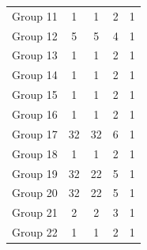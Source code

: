 \begin{table}[t]
\begin{tabular}{@{}rcccc@{}}
        Group 11 & 1                               & 1                                         & 2                                          & 1                                      \\
        Group 12 & 5                               & 5                                         & 4                                          & 1                                      \\
        Group 13 & 1                               & 1                                         & 2                                          & 1                                      \\
        Group 14 & 1                               & 1                                         & 2                                          & 1                                      \\
        Group 15 & 1                               & 1                                         & 2                                          & 1                                      \\
        Group 16 & 1                               & 1                                         & 2                                          & 1                                      \\
        Group 17 & 32                              & 32                                        & 6                                          & 1                                      \\
        Group 18 & 1                               & 1                                         & 2                                          & 1                                      \\
        Group 19 & 32                              & 22                                        & 5                                          & 1                                      \\
        Group 20 & 32                              & 22                                        & 5                                          & 1                                      \\
        Group 21 & 2                               & 2                                         & 3                                          & 1                                      \\
        Group 22 & 1                               & 1                                         & 2                                          & 1                                      \\

\end{tabular}
\end{table}

